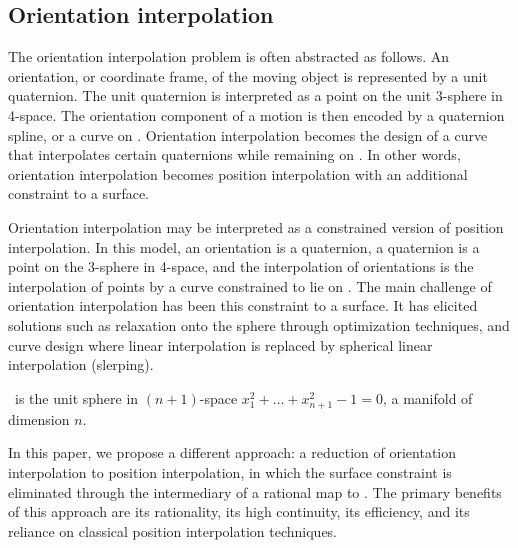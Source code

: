 \documentclass[12pt]{article}
\begin{document}
\subsection{Orientation interpolation}

The orientation interpolation problem is often abstracted as follows.
An orientation, or coordinate frame, of the moving object is 
represented by a unit quaternion.
The unit quaternion is interpreted as a point on the unit 3-sphere  in 4-space.
The orientation component of a motion is then encoded by a quaternion spline,
or a curve on .
Orientation interpolation becomes the design of a curve that interpolates
certain quaternions while remaining on .
In other words, orientation interpolation becomes
position interpolation with an additional constraint to a surface.


Orientation interpolation may be interpreted as a constrained version of position
interpolation.
In this model, an orientation is a quaternion, a quaternion is a point on the 3-sphere
 in 4-space,
and the interpolation of orientations is the interpolation of points
by a curve constrained to lie on .
The main challenge of orientation interpolation has been this constraint to a surface.
It has elicited solutions such as relaxation onto the sphere through optimization
techniques, and curve design where linear interpolation is replaced
by spherical linear interpolation (slerping).

\ is the unit sphere in $(n+1)$-space 
$x_1^2 + \ldots + x_{n+1}^2 - 1 = 0$, a manifold of dimension $n$.

In this paper, we propose a different approach: 
a reduction of orientation interpolation to position interpolation,
in which the surface constraint is eliminated through the intermediary of a rational
map to .
The primary benefits of this approach are its rationality, its high continuity, 
its efficiency, and its reliance on classical position interpolation techniques.
\end{document}
